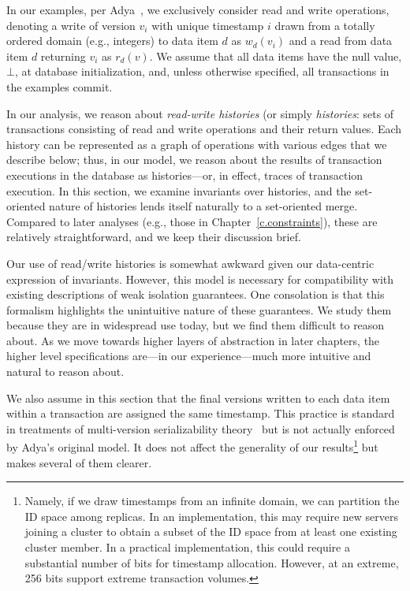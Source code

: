  In our examples, per Adya~\cite{adya}, we
exclusively consider read and write operations, denoting a write of
version $v_i$ with unique timestamp $i$ drawn from a totally ordered
domain (e.g., integers) to data item $d$ as $w_d(v_i)$ and a read from
data item $d$ returning $v_i$ as $r_d(v)$. We assume that all data
items have the null value, $\bot$, at database initialization, and,
unless otherwise specified, all transactions in the examples commit.

In our \iconfluence analysis, we reason about \textit{read-write
  histories} (or simply \textit{histories}: sets of transactions
consisting of read and write operations and their return values. Each
history can be represented as a graph of operations with various edges
that we describe below; thus, in our \iconfluence model, we reason
about the results of transaction executions in the database as
histories---or, in effect, traces of transaction execution. In this
section, we examine invariants over histories, and the set-oriented
nature of histories lends itself naturally to a set-oriented
merge. Compared to later analyses (e.g., those in
Chapter~\ref{c.constraints}), these are relatively straightforward,
and we keep their discussion brief.

Our use of read/write histories is somewhat awkward given our
data-centric expression of invariants. However, this model is
necessary for compatibility with existing descriptions of weak
isolation guarantees. One consolation is that this formalism
highlights the unintuitive nature of these guarantees. We study them
because they are in widespread use today, but we find them difficult
to reason about. As we move towards higher layers of abstraction in
later chapters, the higher level specifications are---in our
experience---much more intuitive and natural to reason about.

We also assume in this section that the final versions written to each
data item within a transaction are assigned the same timestamp. This
practice is standard in treatments of multi-version serializability
theory~\cite{bernstein-book} but is not actually enforced by Adya's
original model. It does not affect the generality of our
results\footnote{Namely, if we draw timestamps from an infinite
  domain, we can partition the ID space among replicas. In an
  implementation, this may require new servers joining a cluster to
  obtain a subset of the ID space from at least one existing cluster
  member. In a practical implementation, this could require a
  substantial number of bits for timestamp allocation. However, at an
  extreme, 256 bits support extreme transaction volumes.} but makes
several of them clearer.

